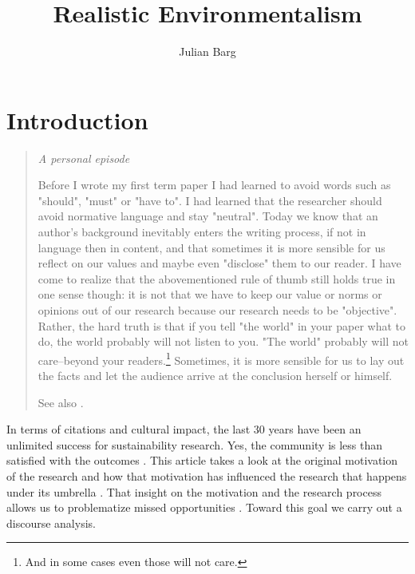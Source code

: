\documentclass{article}
\title{Realistic Environmentalism}
\author{Julian Barg}
\begin{document}
	\maketitle

	\section*{Introduction}

	\begin{quote}
		\itshape
		A personal episode

		Before I wrote my first term paper I had learned to avoid words such as "should", "must" or "have to". I had learned that the researcher should avoid normative language and stay "neutral". Today we know that an author's background inevitably enters the writing process, if not in language then in content, and that sometimes it is more sensible for us reflect on our values and maybe even "disclose" them to our reader. I have come to realize that the abovementioned rule of thumb still holds true in one sense though: it is not that we have to keep our value or norms or opinions out of our research because our research needs to be "objective". Rather, the hard truth is that if you tell "the world" in your paper what to do, the world probably will not listen to you. "The world" probably will not care--beyond your readers.\footnote{And in some cases even those will not care.} Sometimes, it is more sensible for us to lay out the facts and let the audience arrive at the conclusion herself or himself.

		See also \citet{Gouldner1962,Zbaracki2021-02-03,Jones2019,Boisot2010}.
	\end{quote}

	In terms of citations and cultural impact, the last 30 years have been an unlimited success for sustainability research. Yes, the community is less than satisfied with the outcomes \cite[e.g.,][]{Ergene2020}. This article takes a look at the original motivation of the research and how that motivation has influenced the research that happens under its umbrella \citep{Latour1987}. That insight on the motivation and the research process allows us to problematize missed opportunities \citep{Alvesson2011}. Toward this goal we carry out a discourse analysis.

\end{document}
